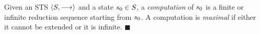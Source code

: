 
\begin{definition}[Computation]
  Given an STS $\langle  S ,  \mathrel{\overset{}\longrightarrow}  \rangle$ and a state
  $s_0 \in S$, a %
  \emph{computation} of $s_0$ is a finite or infinite
  reduction sequence starting from $s_0$.
  A computation is
{\em maximal} if either it cannot be extended or it is infinite.
  \hfill$\blacksquare$
  \end{definition}





